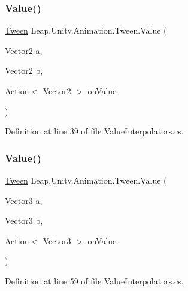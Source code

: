 \subsubsection{\texorpdfstring{Value()}{Value()}\hspace{0.1cm}{\footnotesize\ttfamily [2/5]}}
{\footnotesize\ttfamily \mbox{\hyperlink{struct_leap_1_1_unity_1_1_animation_1_1_tween}{Tween}} Leap.\+Unity.\+Animation.\+Tween.\+Value (\begin{DoxyParamCaption}\item[{Vector2}]{a,  }\item[{Vector2}]{b,  }\item[{Action$<$ Vector2 $>$}]{on\+Value }\end{DoxyParamCaption})}



Definition at line 39 of file Value\+Interpolators.\+cs.

\mbox{\label{struct_leap_1_1_unity_1_1_animation_1_1_tween_ad8eaac902159cb11727ed3fdb9b29f8a}} 
\subsubsection{\texorpdfstring{Value()}{Value()}\hspace{0.1cm}{\footnotesize\ttfamily [3/5]}}
{\footnotesize\ttfamily \mbox{\hyperlink{struct_leap_1_1_unity_1_1_animation_1_1_tween}{Tween}} Leap.\+Unity.\+Animation.\+Tween.\+Value (\begin{DoxyParamCaption}\item[{Vector3}]{a,  }\item[{Vector3}]{b,  }\item[{Action$<$ Vector3 $>$}]{on\+Value }\end{DoxyParamCaption})}



Definition at line 59 of file Value\+Interpolators.\+cs.

\mbox{\label{struct_leap_1_1_unity_1_1_animation_1_1_tween_a4877dc9c6bc0010523f51d21549098fa}} 
